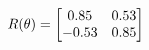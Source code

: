 \documentclass[preview]{standalone}
\begin{document}
\begin{align*}
\special{dvisvgm:raw <g id='unique000'>}R(\theta) = \begin{bmatrix}0.85 & 0.53\\-0.53 & 0.85\end{bmatrix}\special{dvisvgm:raw </g>}
\end{align*}
\end{document}
